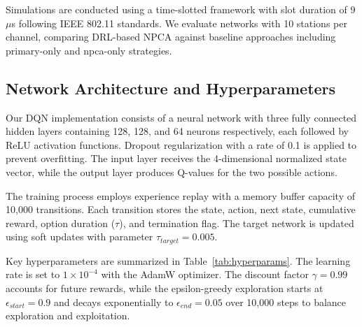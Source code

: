 \documentclass[conference]{IEEEtran}
\begin{document}
Simulations are conducted using a time-slotted framework with slot duration of 9 $\mu$s following IEEE 802.11 standards. We evaluate networks with 10 stations per channel, comparing DRL-based NPCA against baseline approaches including primary-only and npca-only strategies.

\subsection{Network Architecture and Hyperparameters}

Our DQN implementation consists of a neural network with three fully connected hidden layers containing 128, 128, and 64 neurons respectively, each followed by ReLU activation functions. Dropout regularization with a rate of 0.1 is applied to prevent overfitting. The input layer receives the 4-dimensional normalized state vector, while the output layer produces Q-values for the two possible actions.

The training process employs experience replay with a memory buffer capacity of 10,000 transitions. Each transition stores the state, action, next state, cumulative reward, option duration ($\tau$), and termination flag. The target network is updated using soft updates with parameter $\tau_{target} = 0.005$.

Key hyperparameters are summarized in Table~\ref{tab:hyperparams}. The learning rate is set to $1 \times 10^{-4}$ with the AdamW optimizer. The discount factor $\gamma = 0.99$ accounts for future rewards, while the epsilon-greedy exploration starts at $\epsilon_{start} = 0.9$ and decays exponentially to $\epsilon_{end} = 0.05$ over 10,000 steps to balance exploration and exploitation.
\end{document}
